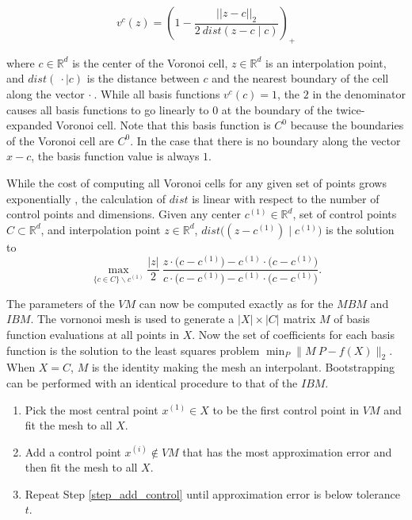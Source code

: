 \begin{equation}
v^c(z) = \left(1 - \frac{||z - c||_2}{2 \ dist(z - c \mid c)} \right)_+
\label{eq_voronoi_basis}
\end{equation}

where $c \in \mathbb{R}^d$ is the center of the Voronoi cell, $z \in \mathbb{R}^d$ is an interpolation point, and $dist(\ \cdot \mid c)$ is the distance between $c$ and the nearest boundary of the cell along the vector $\cdot\ $. While all basis functions $v^c(c) = 1$, the $2$ in the denominator causes all basis functions to go linearly to $0$ at the boundary of the twice-expanded Voronoi cell. Note that this basis function is $C^0$ because the boundaries of the Voronoi cell are $C^0$. In the case that there is no boundary along the vector $x-c$, the basis function value is always $1$.

While the cost of computing all Voronoi cells for any given set of points grows exponentially \cite{dutour2009complexity}, the calculation of $dist$ is linear with respect to the number of control points and dimensions. Given any center $c^{(1)} \in \mathbb{R}^d$, set of control points $C \subset \mathbb{R}^d$, and interpolation point $z \in \mathbb{R}^d$, $dist\bigl((z-c^{(1)}) \mid c^{(1)}\bigr)$ is the solution to
\begin{equation}
  \max_{\{c \in C\}\backslash c^{(1)}} \frac{|z|}{2} \ \frac{z \cdot \bigl(c - c^{(1)}\bigr) - c^{(1)} \cdot \bigl(c - c^{(1)}\bigr)}{c \cdot \bigl(c - c^{(1)}\bigr) - c^{(1)} \cdot \bigl(c - c^{(1)}\bigr)}.
\end{equation}

The parameters of the $VM$ can now be computed exactly as for the $MBM$ and $IBM$. The vornonoi mesh is used to generate a $|X| \times |C|$ matrix $M$ of basis function evaluations at all points in $X$. Now the set of coefficients for each basis function is the solution to the least squares problem $\min_P \bigl\| M \ P - f(X) \bigr\|_2$. When $X = C$, $M$ is the identity making the mesh an interpolant. Bootstrapping can be performed with an identical procedure to that of the $IBM$.
\begin{enumerate}
\item Pick the most central point $x^{(1)} \in X$ to be the first control point in $VM$ and fit the mesh to all $X$.
\item Add a control point $x^{(i)} \notin VM$ that has the most approximation error and then fit the mesh to all $X$. \label{step_add_control}
\item Repeat Step \ref{step_add_control} until approximation error is below tolerance $t$.
\end{enumerate}

